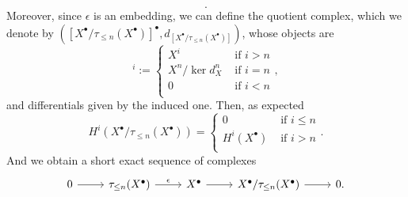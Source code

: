 \begin{defn}
\begin{equation}
	.\end{equation} 
	Moreover, since $\epsilon$ is an embedding, we can define the quotient complex,
	which we denote by
	$\left( [X^\bullet/\tau_{\leq n}(X^\bullet)]^{\bullet}, d_{[X^\bullet/\tau_{\leq n}(X^\bullet)]} \right)$,
	whose objects are
	\begin{equation}
		[X^\bullet/\tau_{\leq n}(X^\bullet)]^i := 
	\begin{cases}
		X^i & \text{ if } i > n\\
		X^n/\ker d_X^n & \text{ if } i = n\\
		0 & \text{ if } i < n\\
	\end{cases} 
	,\end{equation} 
	and differentials given by the induced one.
	Then, as expected
	\begin{equation}
		H^i \left( X^\bullet/\tau_{\leq n}(X^\bullet) \right) =
		\begin{cases}
			0 & \text{ if } i \leq n\\
			H^i(X^\bullet) & \text{ if } i > n\\
		\end{cases} 
	.\end{equation} 
	And we obtain a short exact sequence of complexes
	\begin{equation*}
	\begin{tikzcd}
		0 \arrow[r, "", rightarrow] &
		\tau_{\leq n}(X^\bullet) \arrow[r, "\epsilon", rightarrow] &
		X^\bullet \arrow[r, "", rightarrow] &
		X^\bullet/ \tau_{\leq n}(X^\bullet) \arrow[r, "", rightarrow] &
		0
	.\end{tikzcd}
	\end{equation*}
\end{defn}

